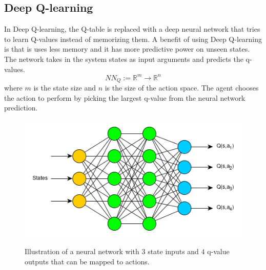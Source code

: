 \documentclass{LTHtwocol} %
\begin{document}
\subsection{Deep Q-learning}
In Deep Q-learning, the Q-table is replaced with a deep neural network that tries to learn Q-values instead of memorizing them.
A benefit of using Deep Q-learning is that is uses less memory and it has more predictive power on unseen states.
The network takes in the system states as input arguments and predicts the q-values.
\begin{equation}
	\label{eqn:neural_network_mapping}
	NN_Q := \mathbb{R}^m \to \mathbb{R}^n
\end{equation}
where $m$ is the state size and $n$ is the size of the action space.
The agent chooses the action to perform by picking the largest q-value from the neural network prediction.
\begin{figure}[H]
	\centering
	\includegraphics[width=0.9\columnwidth]{figures/q_network.png}
	\label{fig:q_network_illustration}
	\caption{Illustration of a neural network with $3$ state inputs and $4$ q-value outputs that can be mapped to actions.}
\end{figure}
\end{document}
